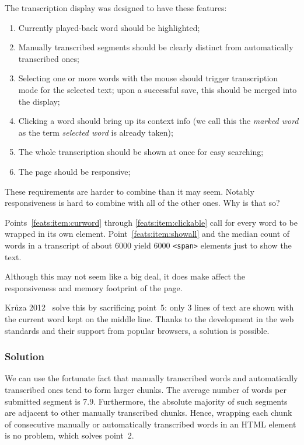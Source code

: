 \documentclass{llncs}
\begin{document}
The transcription display was designed to have these features:
\begin{enumerate}
\item{
    Currently played-back word should be highlighted;
    \label{feats:item:curword}
}
\item{
    Manually transcribed segments should be clearly distinct from automatically
    transcribed ones;
    \label{feats:item:manualdistinct}
}
\item{
    Selecting one or more words with the mouse should trigger transcription mode
    for the selected text;
    upon a successful save, this should be merged into the display;
    \label{feats:item:selectable}
}
\item{
    Clicking a word should bring up its context info (we call this the
    {\em marked word} as the term {\em selected word} is already taken);
    \label{feats:item:clickable}
}
\item{
    The whole transcription should be shown at once for easy searching;
    \label{feats:item:showall}
}
\item{
    The page should be responsive;\label{feats:item:speed}
}
\end{enumerate}

These requirements are harder to combine than it may seem. Notably
responsiveness is hard to combine with all of the other ones. Why is that so?

Points~\ref{feats:item:curword} through \ref{feats:item:clickable}
call for every word to be wrapped in its own element.
Point~\ref{feats:item:showall} and the median count of words in a transcript of
about 6000 yield 6000 \texttt{<span>} elements just to show the text. 

Although this may not seem like a big deal, it does make affect the
responsiveness and memory footprint of the page.

Kr\r{u}za 2012~\cite{kruuza2012making} solve this by sacrificing point~5:
only 3
lines of text are shown with the current word kept on the middle line. Thanks to
the development in the web standards and their support from popular browsers, a
solution is possible.

\subsubsection{Solution}

We can use the fortunate fact that manually transcribed words and automatically
transcribed ones tend to form larger chunks. The average number of words per
submitted segment is 7.9. Furthermore, the absolute majority of such segments
are adjacent to other manually transcribed chunks. 
Hence, wrapping each chunk of consecutive manually or automatically transcribed
words in an HTML element is no problem, which solves
point~2.
\end{document}
